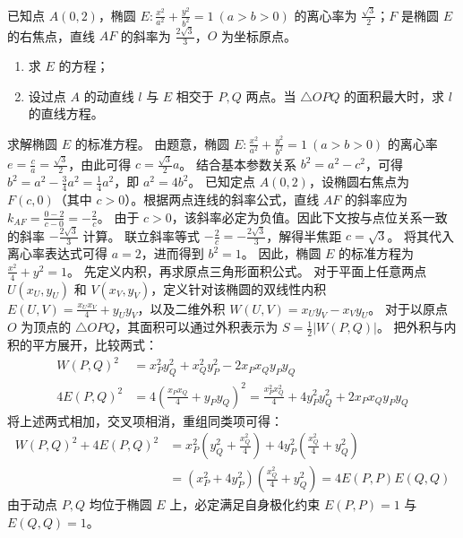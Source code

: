 \begin{example}
已知点 \(A(0,2)\)，椭圆 \(E: \frac{x^2}{a^2} + \frac{y^2}{b^2} = 1\ (a > b > 0)\) 的离心率为 \(\frac{\sqrt{3}}{2}\)；\(F\) 是椭圆 \(E\) 的右焦点，直线 \(AF\) 的斜率为 \(\frac{2\sqrt{3}}{3}\)，\(O\) 为坐标原点。
\begin{enumerate}
    \item  求 \(E\) 的方程；
    \item 设过点 \(A\) 的动直线 \(l\) 与 \(E\) 相交于 \(P,Q\) 两点。当 \(\triangle OPQ\) 的面积最大时，求 \(l\) 的直线方程。
\end{enumerate}
\end{example}
\begin{solution}
求解椭圆 $E$ 的标准方程。
由题意，椭圆 $E: \frac{x^2}{a^2} + \frac{y^2}{b^2} = 1\ (a > b > 0)$ 的离心率 $e = \frac{c}{a} = \frac{\sqrt{3}}{2}$，由此可得 $c = \frac{\sqrt{3}}{2}a$。
结合基本参数关系 $b^2 = a^2 - c^2$，可得 $b^2 = a^2 - \frac{3}{4}a^2 = \frac{1}{4}a^2$，即 $a^2 = 4b^2$。
已知定点 $A(0,2)$，设椭圆右焦点为 $F(c,0)$（其中 $c > 0$）。根据两点连线的斜率公式，直线 $AF$ 的斜率应为 $k_{AF} = \frac{0-2}{c-0} = -\frac{2}{c}$。
由于 $c > 0$，该斜率必定为负值。因此下文按与点位关系一致的斜率 $-\frac{2\sqrt{3}}{3}$ 计算。
联立斜率等式 $-\frac{2}{c} = -\frac{2\sqrt{3}}{3}$，解得半焦距 $c = \sqrt{3}$。
将其代入离心率表达式可得 $a = 2$，进而得到 $b^2 = 1$。
因此，椭圆 $E$ 的标准方程为 $\frac{x^2}{4} + y^2 = 1$。
先定义内积，再求原点三角形面积公式。
对于平面上任意两点 $U(x_U, y_U)$ 和 $V(x_V, y_V)$，定义针对该椭圆的双线性内积 $E(U, V) = \frac{x_U x_V}{4} + y_U y_V$，以及二维外积 $W(U, V) = x_U y_V - x_V y_U$。
对于以原点 $O$ 为顶点的 $\triangle OPQ$，其面积可以通过外积表示为 $S = \frac{1}{2}|W(P, Q)|$。
把外积与内积的平方展开，比较两式：
\begin{align*}
W(P, Q)^2 &= x_P^2 y_Q^2 + x_Q^2 y_P^2 - 2x_P x_Q y_P y_Q \\
4E(P, Q)^2 &= 4 \left( \frac{x_P x_Q}{4} + y_P y_Q \right)^2 = \frac{x_P^2 x_Q^2}{4} + 4y_P^2 y_Q^2 + 2x_P x_Q y_P y_Q
\end{align*}
将上述两式相加，交叉项相消，重组同类项可得：
\begin{align*}
W(P, Q)^2 + 4E(P, Q)^2 &= x_P^2 \left( y_Q^2 + \frac{x_Q^2}{4} \right) + 4y_P^2 \left( \frac{x_Q^2}{4} + y_Q^2 \right) \\
&= \left( x_P^2 + 4y_P^2 \right) \left( \frac{x_Q^2}{4} + y_Q^2 \right) = 4 E(P, P) E(Q, Q)
\end{align*}
由于动点 $P, Q$ 均位于椭圆 $E$ 上，必定满足自身极化约束 $E(P, P) = 1$ 与 $E(Q, Q) = 1$。

\end{solution}
